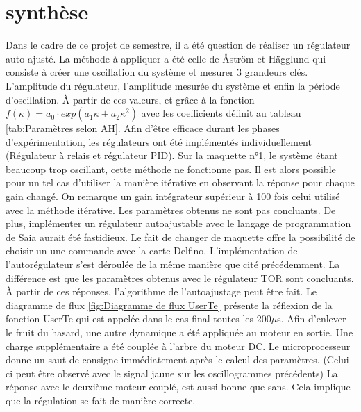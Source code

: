 \section{synthèse}


Dans le cadre de ce projet de semestre, il a été question de réaliser un régulateur auto-ajusté. La méthode à appliquer a été celle de Åström et Hägglund qui consiste à créer une oscillation du système et mesurer 3 grandeurs clés. L'amplitude du régulateur, l'amplitude mesurée du système et enfin la période d'oscillation. \`A partir de ces valeurs, et grâce à la fonction $f(\kappa)=a_0\cdot exp(a_1\kappa +a_2\kappa^2)$ avec les coefficients définit au tableau \ref{tab:Paramètres selon AH}.
Afin d'être efficace durant les phases d'expérimentation, les régulateurs ont été implémentés individuellement (Régulateur à relais et régulateur PID). Sur la maquette n°1, le système étant beaucoup trop oscillant, cette méthode ne fonctionne pas. Il est alors possible pour un tel cas d'utiliser la manière itérative en observant la réponse pour chaque gain changé. On remarque un gain intégrateur supérieur à 100 fois celui utilisé avec la méthode itérative. Les paramètres obtenus ne sont pas concluants. De plus, implémenter un régulateur autoajustable avec le langage de programmation de Saia aurait été fastidieux. Le fait de changer de maquette offre la possibilité de choisir un une commande avec la carte Delfino. L'implémentation de l'autorégulateur s'est déroulée de la même manière que cité précédemment. La différence est que les paramètres obtenus avec le régulateur TOR sont concluants. \`A partir de ces réponses, l'algorithme de l'autoajustage peut être fait. Le diagramme de flux \ref{fig:Diagramme de flux UserTe} présente la réflexion de la fonction UserTe qui est appelée dans le cas final toutes les 200$\mu$s. Afin d'enlever le fruit du hasard, une autre dynamique a été appliquée au moteur en sortie. Une charge supplémentaire a été couplée à l'arbre du moteur DC. Le microprocesseur donne un saut de consigne immédiatement après le calcul des paramètres. (Celui-ci peut être observé avec le signal jaune sur les oscillogrammes précédents) La réponse avec le deuxième moteur couplé, est aussi bonne que sans. Cela implique que la régulation se fait de manière correcte.\\

